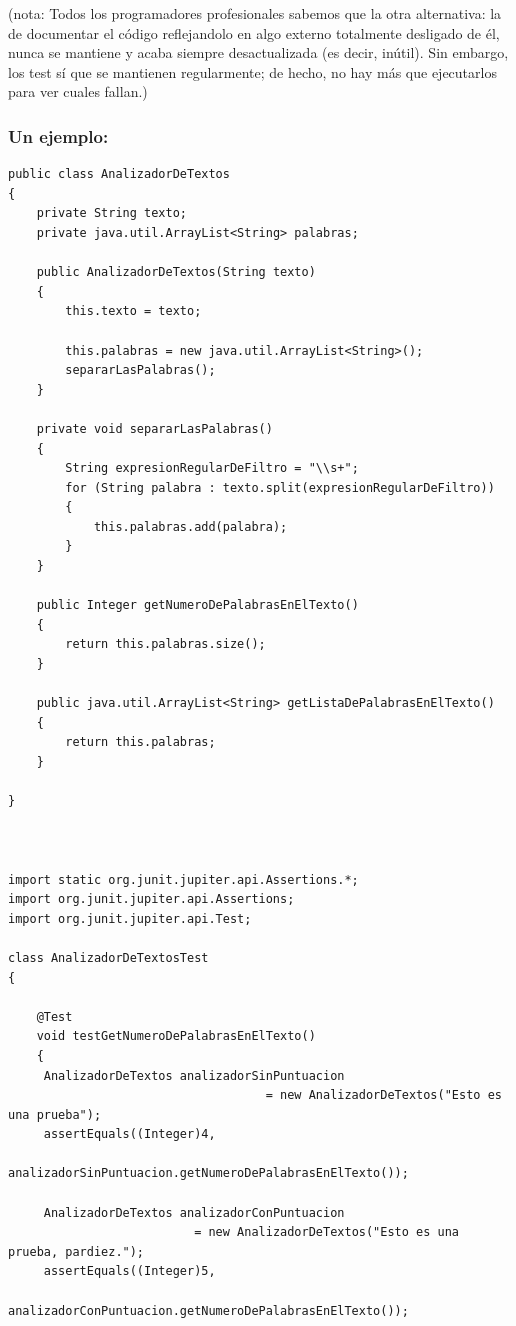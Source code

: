 \documentclass[spanish,12pt,a4paper,final,oneside]{book}
\begin{document}
(nota: Todos los programadores profesionales sabemos que la otra alternativa: la de documentar el código reflejandolo en algo externo totalmente desligado de él, nunca se mantiene y acaba siempre  desactualizada (es decir, inútil). Sin embargo, los test sí que se mantienen regularmente; de hecho, no hay más que ejecutarlos para ver cuales fallan.)


\subsubsection{Un ejemplo:}
\begin{lstlisting}[frame=single]
public class AnalizadorDeTextos
{
    private String texto;
    private java.util.ArrayList<String> palabras;
    
    public AnalizadorDeTextos(String texto)
    {
        this.texto = texto;
        
        this.palabras = new java.util.ArrayList<String>();
        separarLasPalabras();
    }
    
    private void separarLasPalabras()
    {
        String expresionRegularDeFiltro = "\\s+";
        for (String palabra : texto.split(expresionRegularDeFiltro))
        {
            this.palabras.add(palabra);
        }
    }
    
    public Integer getNumeroDePalabrasEnElTexto()
    {
        return this.palabras.size();
    }
    
    public java.util.ArrayList<String> getListaDePalabrasEnElTexto()
    {
        return this.palabras;
    }

}



import static org.junit.jupiter.api.Assertions.*;
import org.junit.jupiter.api.Assertions;
import org.junit.jupiter.api.Test;

class AnalizadorDeTextosTest
{
    
    @Test
    void testGetNumeroDePalabrasEnElTexto()
    {
   	 AnalizadorDeTextos analizadorSinPuntuacion
                                    = new AnalizadorDeTextos("Esto es una prueba");
   	 assertEquals((Integer)4,      
                     analizadorSinPuntuacion.getNumeroDePalabrasEnElTexto());
   	 
   	 AnalizadorDeTextos analizadorConPuntuacion 
                          = new AnalizadorDeTextos("Esto es una prueba, pardiez.");
   	 assertEquals((Integer)5, 
                     analizadorConPuntuacion.getNumeroDePalabrasEnElTexto());
   	 

\end{lstlisting}
\end{document}
